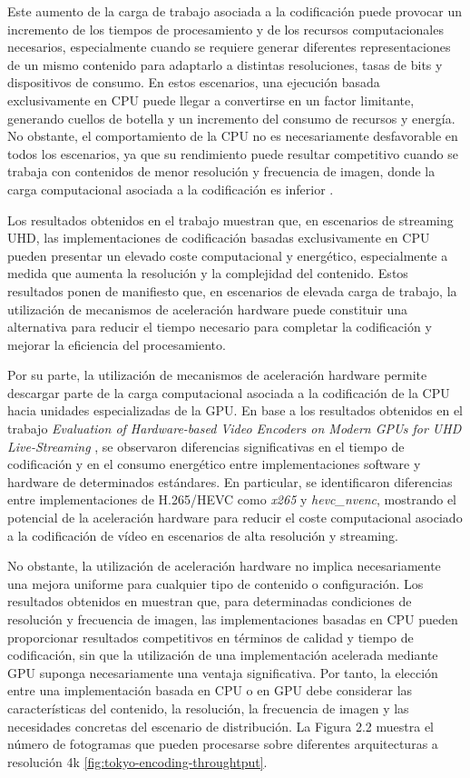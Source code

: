  Este aumento de la carga de trabajo asociada a la codificación puede provocar un incremento de los tiempos de procesamiento y de los recursos computacionales necesarios, especialmente cuando se requiere generar diferentes representaciones de un mismo contenido para adaptarlo a distintas resoluciones, tasas de bits y dispositivos de consumo. En estos escenarios, una ejecución basada exclusivamente en CPU puede llegar a convertirse en un factor limitante, generando cuellos de botella y un incremento del consumo de recursos y energía. No obstante, el comportamiento de la CPU no es necesariamente desfavorable en todos los escenarios, ya que su rendimiento puede resultar competitivo cuando se trabaja con contenidos de menor resolución y frecuencia de imagen, donde la carga computacional asociada a la codificación es inferior \cite{gpuvscpu-videoencoding}.
 
 Los resultados obtenidos en el trabajo \cite{tokyo-livestreming-acceleration-gpu} muestran que, en escenarios de streaming UHD, las implementaciones de codificación basadas exclusivamente en CPU pueden presentar un elevado coste computacional y energético, especialmente a medida que aumenta la resolución y la complejidad del contenido. Estos resultados ponen de manifiesto que, en escenarios de elevada carga de trabajo, la utilización de mecanismos de aceleración hardware puede constituir una alternativa para reducir el tiempo necesario para completar la codificación y mejorar la eficiencia del procesamiento.
 
 Por su parte, la utilización de mecanismos de aceleración hardware permite descargar parte de la carga computacional asociada a la codificación de la CPU hacia unidades especializadas de la GPU. En base a los resultados obtenidos en el trabajo \textit{Evaluation of Hardware-based Video Encoders on Modern GPUs for UHD Live-Streaming} \cite{tokyo-livestreming-acceleration-gpu}, se observaron diferencias significativas en el tiempo de codificación y en el consumo energético entre implementaciones software y hardware de determinados estándares. En particular, se identificaron diferencias entre implementaciones de H.265/HEVC como \textit{x265} y \textit{hevc\_nvenc}, mostrando el potencial de la aceleración hardware para reducir el coste computacional asociado a la codificación de vídeo en escenarios de alta resolución y streaming.
 
 No obstante, la utilización de aceleración hardware no implica necesariamente una mejora uniforme para cualquier tipo de contenido o configuración. Los resultados obtenidos en \cite{gpuvscpu-videoencoding} muestran que, para determinadas condiciones de resolución y frecuencia de imagen, las implementaciones basadas en CPU pueden proporcionar resultados competitivos en términos de calidad y tiempo de codificación, sin que la utilización de una implementación acelerada mediante GPU suponga necesariamente una ventaja significativa. Por tanto, la elección entre una implementación basada en CPU o en GPU debe considerar las características del contenido, la resolución, la frecuencia de imagen y las necesidades concretas del escenario de distribución. La Figura 2.2 muestra el número de fotogramas que pueden procesarse sobre diferentes arquitecturas a resolución 4k \ref{fig:tokyo-encoding-throughtput}.
 
